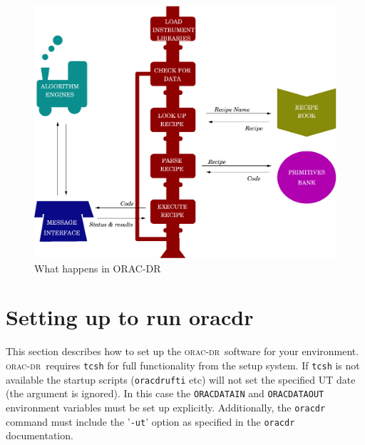 \documentclass[twoside,11pt]{article}
\newcommand{\xlabel}[1]{}
\renewcommand{\_}{\texttt{\symbol{95}}}
\newcommand{\oracdr}{\textsc{orac-dr}}
\begin{document}
\begin{figure}
\includegraphics[width=\textwidth]{sun230_train.eps}
\caption{What happens in ORAC-DR}
\end{figure}


\section{\xlabel{setting_up_to_run_oracdr}Setting up to run oracdr\label{Setting_up_to_run_oracdr}}

This section describes how to set up the \oracdr\ software for your
environment. \oracdr\ requires \texttt{tcsh} for full functionality from the
setup system. If \texttt{tcsh} is not available the startup scripts
(\texttt{oracdr\_ufti} etc) will not set the specified UT date (the argument
is ignored). In this case the \texttt{ORAC\_DATA\_IN} and \texttt{ORAC\_DATA\_OUT}
environment variables must be set up explicitly. Additionally, the
\texttt{oracdr} command must include the '\texttt{-ut}' option as specified in the
\texttt{oracdr} documentation.
\end{document}
